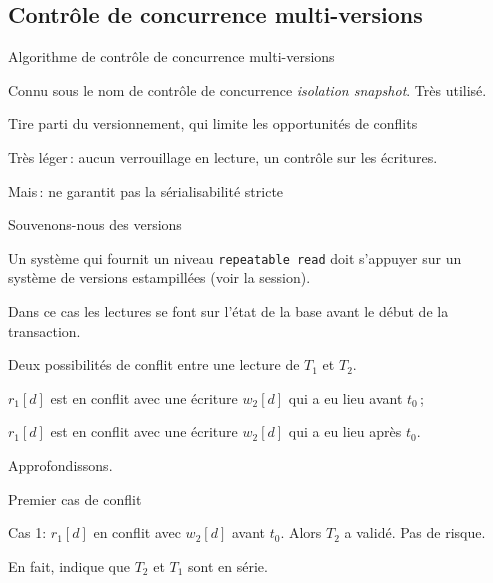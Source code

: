 

\subsection{Contrôle de concurrence multi-versions}


\begin{frame}{Algorithme de contrôle de concurrence multi-versions}

Connu sous le nom de contrôle de concurrence \textit{isolation snapshot}. Très utilisé.

\vfill

Tire parti du versionnement, qui limite les opportunités de conflits

\vfill

Très léger\,: aucun verrouillage en lecture, un contrôle sur les écritures.

\vfill

\alert{Mais}\,: ne garantit pas la sérialisabilité stricte

\end{frame}

\begin{frame}{Souvenons-nous des versions}

Un système qui fournit un niveau \texttt{repeatable read} doit s'appuyer sur un
système de versions estampillées (voir la session).

\vfill

Dans ce cas les lectures se font sur l'état de la base \alert{avant} le début de la transaction.

\vfill 

Deux possibilités de conflit entre une \alert{lecture} de $T_1$ et $T_2$.
\begin{redbullet}
  \item $r_1[d]$ est en conflit avec une écriture $w_2[d]$ 
   qui a eu lieu \alert{avant} $t_0$\,;

  \item $r_1[d]$ est en conflit avec une écriture $w_2[d]$ 
   qui a eu lieu \alert{après} $t_0$.

\end{redbullet}

\medskip

Approfondissons.  
\end{frame}

\begin{frame}{Premier cas de conflit}

Cas 1: $r_1[d]$ en conflit avec $w_2[d]$  \alert{avant} $t_0$. Alors $T_2$ a validé. Pas de risque.

\vfill


\vfill

En fait, indique que $T_2$ et $T_1$ sont en série.

\end{frame}


